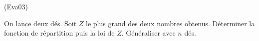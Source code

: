 \begin{tiny}(Eva03)\end{tiny} On lance deux dés. Soit $Z$ le plus grand des deux nombres obtenus. Déterminer la fonction de répartition puis la loi de $Z$. Généraliser avec $n$ dés. 